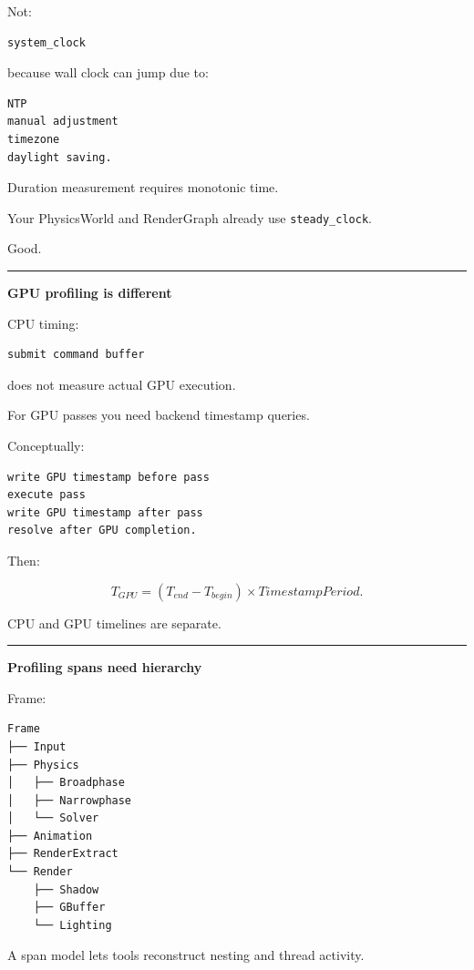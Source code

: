 Not:

\begin{verbatim}
system_clock
\end{verbatim}

because wall clock can jump due to:

\begin{verbatim}
NTP
manual adjustment
timezone
daylight saving.
\end{verbatim}

Duration measurement requires monotonic time.

Your PhysicsWorld and RenderGraph already use \texttt{steady\_clock}.

Good.

\begin{center}\rule{0.5\linewidth}{0.5pt}\end{center}

\textbf{GPU profiling is different}

CPU timing:

\begin{verbatim}
submit command buffer
\end{verbatim}

does not measure actual GPU execution.

For GPU passes you need backend timestamp queries.

Conceptually:

\begin{verbatim}
write GPU timestamp before pass
execute pass
write GPU timestamp after pass
resolve after GPU completion.
\end{verbatim}

Then:

\[
T_{GPU}
=
(T_{end}-T_{begin})
\times TimestampPeriod.
\]

CPU and GPU timelines are separate.

\begin{center}\rule{0.5\linewidth}{0.5pt}\end{center}

\textbf{Profiling spans need hierarchy}

Frame:

\begin{verbatim}
Frame
├── Input
├── Physics
│   ├── Broadphase
│   ├── Narrowphase
│   └── Solver
├── Animation
├── RenderExtract
└── Render
    ├── Shadow
    ├── GBuffer
    └── Lighting
\end{verbatim}

A span model lets tools reconstruct nesting and thread activity.

